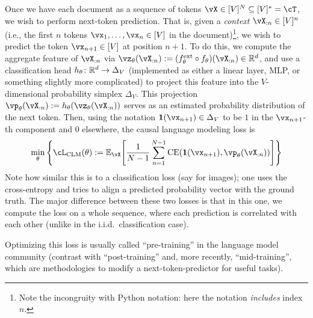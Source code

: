 \documentclass[\toplevelprefix/book-main.tex]{subfiles}
\begin{document}
Once we have each document as a sequence of tokens \(\vX \in [V]^{N} \subseteq [V]^{*} = \cT\), we wish to perform next-token prediction. That is, given a \textit{context} \(\vX_{:n} \in [V]^{n}\) (i.e., the first \(n\) tokens \(\vx_{1}, \dots, \vx_{n} \in [V]\) in the document)\footnote{Note the incongruity with Python notation: here the notation \textit{includes} index \(n\).}, we wish to predict the token \(\vx_{n + 1} \in [V]\) at position \(n + 1\). To do this, we compute the aggregate feature of \(\vX_{:n}\) via \(\vz_{\theta}(\vX_{:n}) := (f_{\theta}^{\ext} \circ f_{\theta})(\vX_{:n}) \in \R^{d}\), and use a classification head \(h_{\theta} \colon \mathbb{R}^{d} \to \Delta_{V}\) (implemented as either a linear layer, MLP, or something slightly more complicated) to project this feature into the \(V\)-dimensional probability simplex \(\Delta_{V}\). This projection \(\vp_{\theta}(\vX_{:n}) := h_{\theta}(\vz_{\theta}(\vX_{:n}))\) serves as an estimated probability distribution of the next token. Then, using the notation \(\vone(\vx_{n + 1}) \in \Delta_{V}\) to be \(1\) in the \(\vx_{n + 1}\)-th component and \(0\) elsewhere, the causal language modeling loss is
\begin{equation}\label{eq:clm_loss}
    \min_{\theta}\bc{\cL_{\mathrm{CLM}}(\theta) := \Ex_{\vX}\rs{\frac{1}{N - 1}\sum_{n = 1}^{N - 1}\CE(\vone(\vx_{n + 1}), \vp_{\theta}(\vX_{:n}))}}
\end{equation}
Note how similar this is to a classification loss (say for images); one uses the cross-entropy and tries to align a predicted probability vector with the ground truth. The major difference between these two losses is that in this one, we compute the loss on a whole sequence, where each prediction is correlated with each other (unlike in the i.i.d.~classification case). 

Optimizing this loss is usually called ``pre-training'' in the language model community (contrast with ``post-training'' and, more recently, ``mid-training'', which are methodologies to modify a next-token-predictor for useful tasks).
\end{document}
